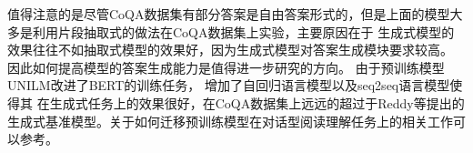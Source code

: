 




值得注意的是尽管CoQA数据集有部分答案是自由答案形式的，但是上面的模型大多是利用片段抽取式的做法在CoQA数据集上实验，主要原因在于
生成式模型的效果往往不如抽取式模型的效果好，因为生成式模型对答案生成模块要求较高。
因此如何提高模型的答案生成能力是值得进一步研究的方向。
由于预训练模型UNILM改进了BERT的训练任务，
增加了自回归语言模型以及seq2seq语言模型使得其
在生成式任务上的效果很好，在CoQA数据集上远远的超过于Reddy等提出的生成式基准模型。关于如何迁移预训练模型在对话型阅读理解任务上的相关工作可以参考。






